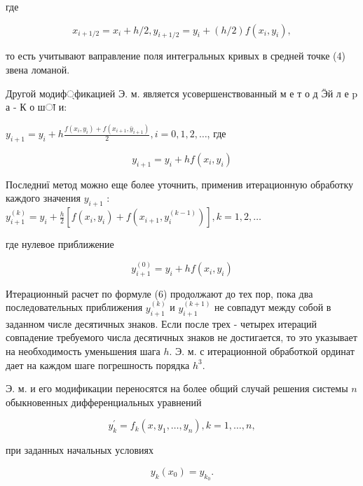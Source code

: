 \documentclass[10pt]{article}
\begin{document}
где



\[

x_{i+1 / 2}=x_{i}+h / 2, y_{i+1 / 2}=y_{i}+(h / 2) f\left(x_{i}, y_{i}\right),

\]



то есть учитывают ваправление поля интегральных кривых в средней точке (4) звена ломаной.



Другой модиф্фикацией Э. м. является усовершенствованный м е т о д Ӭй л е $\mathrm{p}$ а - К $о$ шा и:



$y_{i+1}=y_{i}+h \frac{f\left(x_{i}, y_{i}\right)+f\left(x_{i+1}, \bar{y}_{i+1}\right)}{2}, i=0,1,2, \ldots$, где



\[

y_{i+1}=y_{i}+h f\left(x_{i}, y_{i}\right)

\]



Последниї метод можно еще более уточнить, применив итерационную обработку каждого значения $y_{i+1}$ : $y_{i+1}^{(k)}=y_{i}+\frac{h}{2}\left[f\left(x_{i}, y_{i}\right)+f\left(x_{i+1}, y_{i}^{(k-1)}\right)\right], k=1,2, \ldots$



где нулевое приближение



\[

y_{i+1}^{(0)}=y_{i}+h f\left(x_{i}, y_{i}\right)

\]



Итерационный расчет по формуле (6) продолжают до тех пор, пока два последовательных приближения $y_{i+1}^{(k)}$ и $y_{i+1}^{(k+1)}$ не совпадут между собой в заданном числе десятичных знаков. Если после трех - четырех итераций совпадение требуемого числа десятичных знаков не достигается, то это указывает на необходимость уменьшения шага $h$. Э. м. с итерационной обработкой ординат дает на каждом шаге погрешность порядка $h^{3}$.



Э. м. и его модификации переносятся на более общий случай решения системы $n$ обыкновенных дифференциальных уравнений



\[

y_{k}^{\prime}=f_{k}\left(x, y_{1}, \ldots, y_{n}\right), k=1, \ldots, n,

\]



при заданных начальных условиях



\[

y_{k}\left(x_{0}\right)=y_{k_{0}} .

\]
\end{document}
